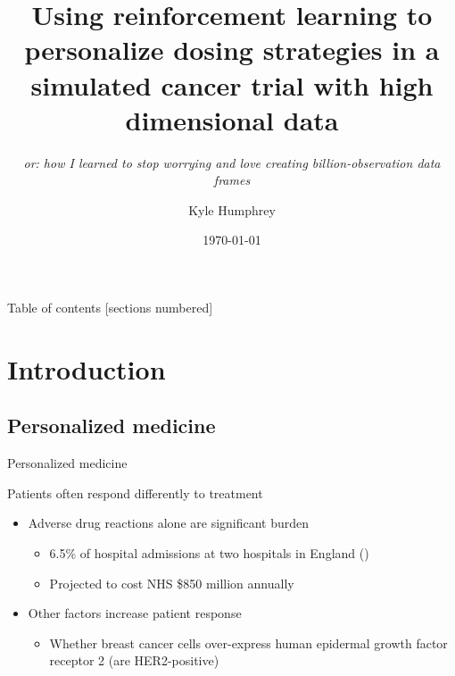 \documentclass{beamer}
\title{Using reinforcement learning to personalize dosing strategies in a simulated cancer trial with high dimensional data}
\subtitle{\sl or: how I learned to stop worrying and love creating billion-observation data frames}
\date{\today}
\author{Kyle Humphrey}
\institute{University of Arizona}
\begin{document}
\maketitle

\begin{frame}[c]{Table of contents}
  [sections numbered]
  \tableofcontents
\end{frame}

\section{Introduction}

\subsection{Personalized medicine} %
\label{sub:personalized_medicine}

\begin{frame}[c]{Personalized medicine}

Patients often respond differently to treatment
\begin{itemize}[<+(1)->]
  \item Adverse drug reactions alone are significant burden 
  \begin{itemize}
    \item 6.5\% of hospital admissions at two hospitals in England  (\cite{Pirmohamed2004})
    \item Projected to cost NHS \$850 million annually 
  \end{itemize}
  \item Other factors increase patient response
  \begin{itemize}
    \item Whether breast cancer cells over-express human epidermal growth factor receptor 2 (are HER2-positive)\footnotemark 
  \end{itemize}
\end{itemize}


\end{frame}
\end{document}
